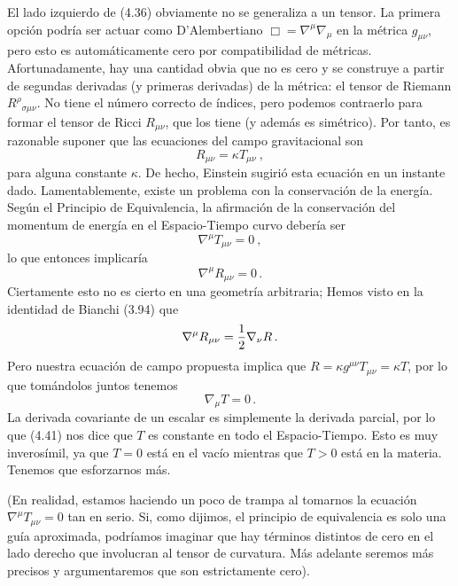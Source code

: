 \documentclass[11pt,b5paper,openany,twoside]{book}
\newcommand{\mn}{{\mu\nu}}
\begin{document}
El lado izquierdo de (4.36) obviamente no se generaliza a un tensor.
La primera opción podría ser actuar como D'Alembertiano $\Box = \nabla^\mu \nabla_\mu$ en la métrica $g_\mn$, pero esto es automáticamente cero por compatibilidad de métricas.
Afortunadamente, hay una cantidad obvia que no es cero y se construye a partir de segundas derivadas (y primeras derivadas) de la métrica: el tensor de Riemann $R^\rho{}_{\sigma\mn}$.
No tiene el número correcto de índices, pero podemos contraerlo para formar el tensor de Ricci $R_{\mn}$, que los tiene (y además es simétrico).
Por tanto, es razonable suponer que las ecuaciones del campo gravitacional son
\begin{equation}
R_{\mn} = \kappa T_{\mn}\ ,\label{4.37}
\end{equation}
para alguna constante $\kappa$.
De hecho, Einstein sugirió esta ecuación en un instante dado.
Lamentablemente, existe un problema con la conservación de la energía.
Según el Principio de Equivalencia, la afirmación de la conservación del momentum de energía en el Espacio-Tiempo curvo debería ser
\begin{equation}
\nabla^\mu T_{\mn} =0\ ,\label{4.38}
\end{equation}
lo que entonces implicaría
\begin{equation}
\nabla^\mu R_{\mn} =0\,.\label{4.39}
\end{equation}
Ciertamente esto no es cierto en una geometría arbitraria; Hemos visto en la identidad de Bianchi (3.94) que
\begin{equation}
\nabla^\mu R_{\mn} ={1\over 2}\nabla_\nu R\,.\label{4.40}
\end{equation}
Pero nuestra ecuación de campo propuesta implica que $R=\kappa g^{\mn} T_{\mn} = \kappa T$, por lo que tomándolos juntos tenemos
\begin{equation}
\nabla_\mu T=0\,.\label{4.41}
\end{equation}
La derivada covariante de un escalar es simplemente la derivada parcial, por lo que (4.41) nos dice que $T$ es constante en todo el Espacio-Tiempo.
Esto es muy inverosímil, ya que $T=0$ está en el vacío mientras que $T>0$ está en la materia.
Tenemos que esforzarnos más.

(En realidad, estamos haciendo un poco de trampa al tomarnos la ecuación $\nabla^\mu T_{\mn} =0$ tan en serio.
Si, como dijimos, el principio de equivalencia es solo una guía aproximada, podríamos imaginar que hay términos distintos de cero en el lado derecho que involucran al tensor de curvatura.
Más adelante seremos más precisos y argumentaremos que son estrictamente cero).
\end{document}

